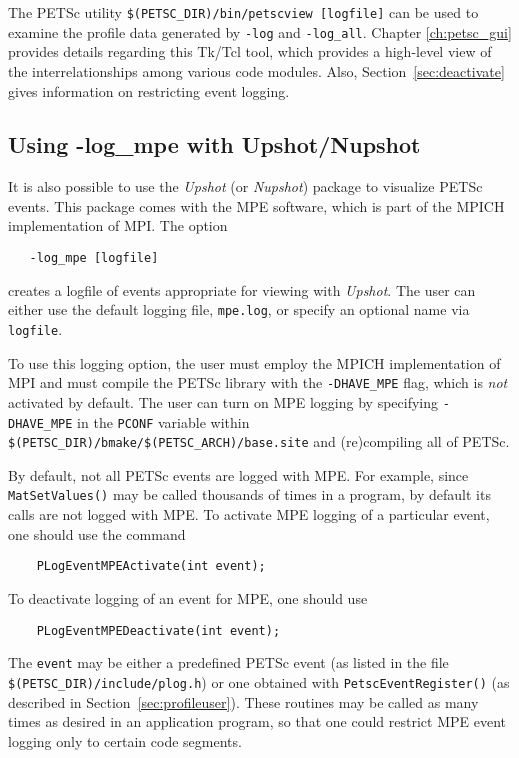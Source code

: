 The PETSc utility {\tt \$(PETSC\_DIR)/bin/petscview [logfile]}
 can be used to examine the profile data generated by
{\tt -log} and {\tt -log\_all}.  Chapter \ref{ch:petsc_gui} provides
details regarding this Tk/Tcl tool, which provides a high-level view of
the interrelationships among various code modules. Also,
Section~\ref{sec:deactivate} gives information on restricting event logging.

\subsection{Using -log\_mpe with Upshot/Nupshot}
\label{sec:mpelogs}

It is also possible to use the {\em Upshot} (or {\em Nupshot}) package
\cite{upshot}    to visualize PETSc events. 
This package comes with the MPE software, which is part of the MPICH
\cite{mpich-web-page} implementation of MPI.
The option 
\begin{verbatim}
   -log_mpe [logfile]
\end{verbatim}
creates a logfile of events appropriate for viewing with {\em Upshot}.
The user can either use the default logging file, {\tt mpe.log}, or
specify an optional name via {\tt logfile}.  

To use this logging
option, the user must employ the MPICH implementation of MPI and must
compile the PETSc library with the {\tt -DHAVE\_MPE} flag, which is
{\em not} activated by default. The user can turn on MPE logging by
specifying {\tt -DHAVE\_MPE} in the {\tt PCONF} variable within
{\tt \$(PETSC\_DIR)/bmake/\$(PETSC\_ARCH)/base.site} and
(re)compiling all of PETSc.

By default, not all PETSc events are logged with MPE. For example,
since {\tt MatSetValues()} may be called thousands of times in a program,
by default its calls are not logged with MPE. To activate MPE logging of
a particular event, one should use the command 
\begin{verbatim}
    PLogEventMPEActivate(int event);
\end{verbatim}
To deactivate logging of an event for MPE, one should use 
\begin{verbatim}
    PLogEventMPEDeactivate(int event);
\end{verbatim}
The {\tt event} may be either a predefined PETSc event (as listed in
the file {\tt \$(PETSC\_DIR)/include/plog.h}) or one obtained with
{\tt PetscEventRegister()} (as described in
Section~\ref{sec:profileuser}).  These routines may be called as many
times as desired in an application program, so that one could restrict
MPE event logging only to certain code segments.

